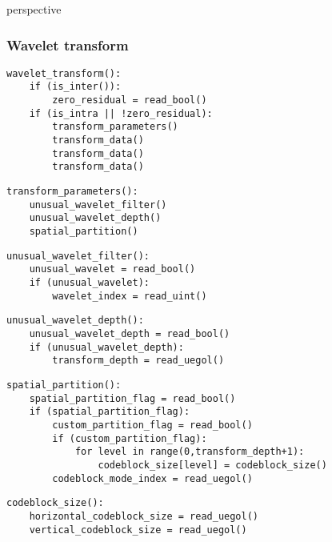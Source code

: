 \begin{streamsyntax}{perspective}{}
 \bsEND
{}
\end{streamsyntax}

\subsubsection{Wavelet transform}

\begin{verbatim}
wavelet_transform():
    if (is_inter()):
        zero_residual = read_bool()
    if (is_intra || !zero_residual):
        transform_parameters()
        transform_data()
        transform_data()
        transform_data()
\end{verbatim}

\begin{verbatim}
transform_parameters():
    unusual_wavelet_filter()
    unusual_wavelet_depth()
    spatial_partition()
\end{verbatim}

\begin{verbatim}
unusual_wavelet_filter():
    unusual_wavelet = read_bool()
    if (unusual_wavelet):
        wavelet_index = read_uint()
\end{verbatim}

\begin{verbatim}
unusual_wavelet_depth():
    unusual_wavelet_depth = read_bool()
    if (unusual_wavelet_depth):
        transform_depth = read_uegol()
\end{verbatim}

\begin{verbatim}
spatial_partition():
    spatial_partition_flag = read_bool()
    if (spatial_partition_flag):
        custom_partition_flag = read_bool()
        if (custom_partition_flag):
            for level in range(0,transform_depth+1):
                codeblock_size[level] = codeblock_size()
        codeblock_mode_index = read_uegol()
\end{verbatim}

\begin{verbatim}
codeblock_size():
    horizontal_codeblock_size = read_uegol()
    vertical_codeblock_size = read_uegol()
\end{verbatim}

